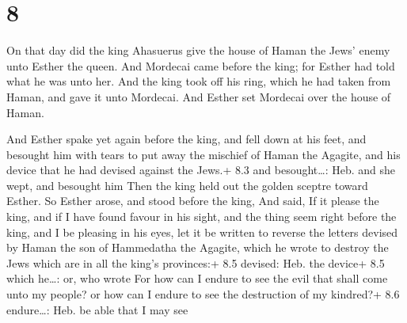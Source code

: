 \hypertarget{section-7}{%
\section{8}\label{section-7}}

 On that day did the king Ahasuerus give the house of Haman
the Jews' enemy unto Esther the queen. And Mordecai came before the
king; for Esther had told what he was unto her.  And the
king took off his ring, which he had taken from Haman, and gave it unto
Mordecai. And Esther set Mordecai over the house of Haman.

 And Esther spake yet again before the king, and fell down
at his feet, and besought him with tears to put away the mischief of
Haman the Agagite, and his device that he had devised against the Jews.+
8.3 and besought\ldots: Heb. and she wept, and besought him 
Then the king held out the golden sceptre toward Esther. So Esther
arose, and stood before the king,  And said, If it please
the king, and if I have found favour in his sight, and the thing seem
right before the king, and I be pleasing in his eyes, let it be written
to reverse the letters devised by Haman the son of Hammedatha the
Agagite, which he wrote to destroy the Jews which are in all the king's
provinces:+ 8.5 devised: Heb. the device+ 8.5 which he\ldots: or, who
wrote  For how can I endure to see the evil that shall come
unto my people? or how can I endure to see the destruction of my
kindred?+ 8.6 endure\ldots: Heb. be able that I may see

